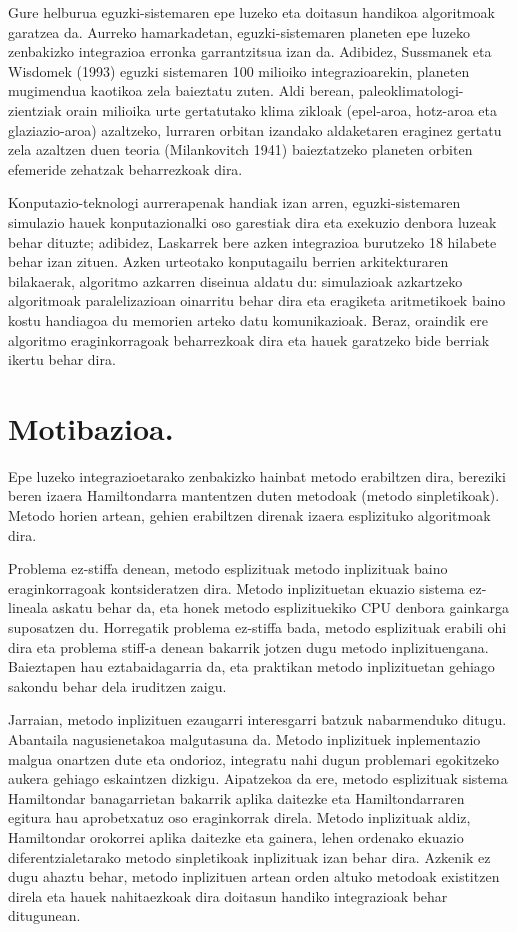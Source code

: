 Gure helburua eguzki-sistemaren epe luzeko eta doitasun handikoa algoritmoak garatzea da. Aurreko hamarkadetan, eguzki-sistemaren planeten epe luzeko zenbakizko integrazioa erronka garrantzitsua izan da. Adibidez, Sussmanek eta Wisdomek (1993) \cite{Sussman1992} eguzki sistemaren 100 milioiko integrazioarekin, planeten mugimendua kaotikoa zela baieztatu zuten. Aldi berean, paleoklimatologi-zientziak orain milioika urte gertatutako klima zikloak (epel-aroa, hotz-aroa eta glaziazio-aroa) azaltzeko, lurraren orbitan izandako aldaketaren eraginez gertatu zela azaltzen duen teoria (Milankovitch 1941) \cite{Berger2012} baieztatzeko planeten orbiten efemeride zehatzak beharrezkoak dira.        

Konputazio-teknologi aurrerapenak handiak izan arren, eguzki-sistemaren simulazio hauek konputazionalki oso garestiak dira eta exekuzio denbora luzeak behar dituzte; adibidez, Laskarrek  bere azken integrazioa burutzeko 18 hilabete behar izan zituen. Azken urteotako konputagailu berrien arkitekturaren bilakaerak, algoritmo azkarren diseinua aldatu du: simulazioak azkartzeko algoritmoak paralelizazioan oinarritu behar dira eta eragiketa aritmetikoek baino kostu handiagoa du memorien arteko datu komunikazioak. Beraz, oraindik ere algoritmo eraginkorragoak beharrezkoak dira eta hauek garatzeko bide berriak ikertu behar dira.


\section{Motibazioa.}
\label{intro}

Epe luzeko integrazioetarako zenbakizko hainbat metodo erabiltzen dira, bereziki beren izaera Hamiltondarra mantentzen duten metodoak (metodo sinpletikoak). Metodo horien artean, gehien erabiltzen direnak izaera esplizituko algoritmoak dira.

Problema ez-stiffa denean, metodo esplizituak  metodo inplizituak baino eraginkorragoak kontsideratzen dira. Metodo inplizituetan ekuazio sistema ez-lineala askatu behar da, eta honek metodo esplizituekiko CPU denbora gainkarga suposatzen du. Horregatik problema ez-stiffa bada, metodo esplizituak erabili ohi dira eta problema stiff-a denean bakarrik jotzen dugu metodo inplizituengana. Baieztapen hau eztabaidagarria da, eta praktikan metodo inplizituetan gehiago sakondu behar dela iruditzen zaigu. 

Jarraian, metodo inplizituen ezaugarri interesgarri batzuk nabarmenduko ditugu. Abantaila nagusienetakoa malgutasuna da.  Metodo inplizituek inplementazio malgua onartzen dute eta ondorioz, integratu nahi dugun problemari egokitzeko aukera gehiago eskaintzen dizkigu. Aipatzekoa da ere, metodo esplizituak sistema Hamiltondar banagarrietan bakarrik aplika daitezke eta Hamiltondarraren egitura hau aprobetxatuz oso eraginkorrak direla. Metodo inplizituak aldiz, Hamiltondar orokorrei aplika daitezke eta gainera, lehen ordenako ekuazio diferentzialetarako  metodo sinpletikoak inplizituak izan behar dira.  Azkenik ez dugu ahaztu behar, metodo inplizituen artean orden altuko metodoak existitzen direla  eta hauek nahitaezkoak dira doitasun handiko integrazioak behar ditugunean.     


